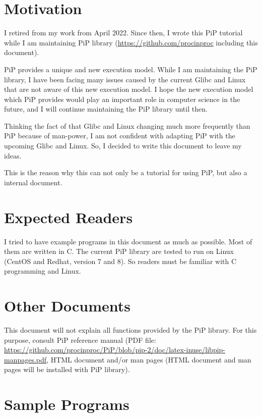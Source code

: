 
\section*{Motivation}

I retired from my work from April 2022. Since then, I wrote this PiP
tutorial while I am maintaining PiP library
(\url{https://github.com/procinproc} including this document).

PiP provides a unique and new execution model. While I am maintaining
the PiP library, I have been facing many issues caused by the current
Glibc and Linux that are not aware of this new execution model. 
I hope the new execution model which PiP provides would play an
important role in computer science in the future, and I will continue
maintaining the PiP library until then.

Thinking the fact of that Glibc and Linux changing much more
frequently than PiP because of man-power, I am not confident with
adapting PiP with the upcoming Glibc and Linux. So, I decided to write
this document to leave my ideas.

This is the reason why this can not only be a tutorial for
using PiP, but also a internal document. 

\section*{Expected Readers}

I tried to have example programs in this document as much as
possible. Most of them are written in C. The current PiP library are
tested to run on Linux (CentOS and Redhat, version 7 and 8). So
readers must be familiar with C programming and Linux.

\section*{Other Documents}

This document will not explain all functions provided by the PiP
library. For this purpose, consult PiP reference manual
(PDF file:
\url{https://github.com/procinproc/PiP/blob/pip-2/doc/latex-inuse/libpip-manpages.pdf}, HTML document and/or man pages (HTML document and man pages will be
installed with PiP library).


\section*{Sample Programs}

